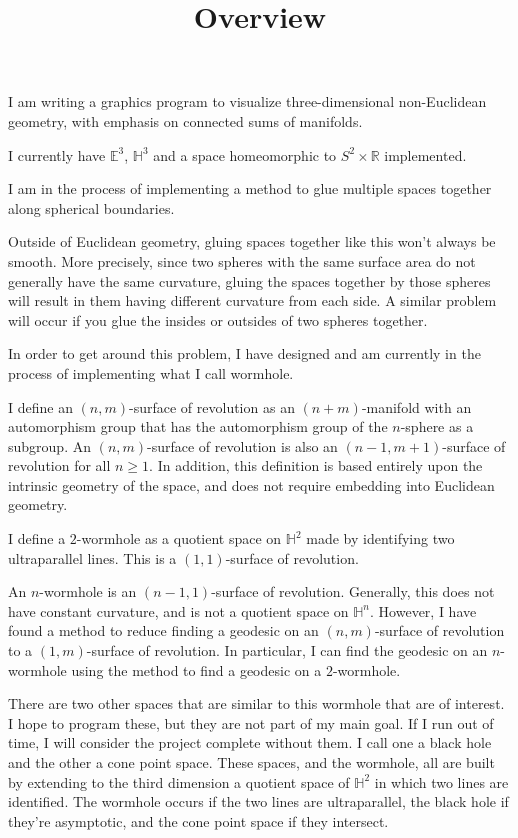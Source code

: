 \documentclass[12pt]{amsart}
\begin{document}
\title{Overview}
\maketitle

I am writing a graphics program to visualize three-dimensional non-Euclidean geometry, with emphasis on connected sums of manifolds.

I currently have $\mathbb{E}^3$, $\mathbb{H}^3$ and a space homeomorphic to $S^2 \times \mathbb{R}$ implemented.

I am in the process of implementing a method to glue multiple spaces together along spherical boundaries.

Outside of Euclidean geometry, gluing spaces together like this won't always be smooth. More precisely, since two spheres with the same surface area do not generally have the same curvature, gluing the spaces together by those spheres will result in them having different curvature from each side. A similar problem will occur if you glue the insides or outsides of two spheres together.

In order to get around this problem, I have designed and am currently in the process of implementing what I call wormhole.

I define an $(n,m)$-surface of revolution as an $(n+m)$-manifold with an automorphism group that has the automorphism group of the $n$-sphere as a subgroup. An $(n,m)$-surface of revolution is also an $(n-1,m+1)$-surface of revolution for all $n \geq 1$. In addition, this definition is based entirely upon the intrinsic geometry of the space, and does not require embedding into Euclidean geometry.


I define a $2$-wormhole as a quotient space on $\mathbb{H}^2$ made by identifying two ultraparallel lines. This is a $(1,1)$-surface of revolution.

An $n$-wormhole is an $(n-1,1)$-surface of revolution. Generally, this does not have constant curvature, and is not a quotient space on $\mathbb{H}^n$. However, I have found a method to reduce finding a geodesic on an $(n,m)$-surface of revolution to a $(1,m)$-surface of revolution. In particular, I can find the geodesic on an $n$-wormhole using the method to find a geodesic on a $2$-wormhole.

There are two other spaces that are similar to this wormhole that are of interest. I hope to program these, but they are not part of my main goal. If I run out of time, I will consider the project complete without them. I call one a black hole and the other a cone point space. These spaces, and the wormhole, all are built by extending to the third dimension a quotient space of $\mathbb{H}^2$ in which two lines are identified. The wormhole occurs if the two lines are ultraparallel, the black hole if they're asymptotic, and the cone point space if they intersect.
\end{document}
